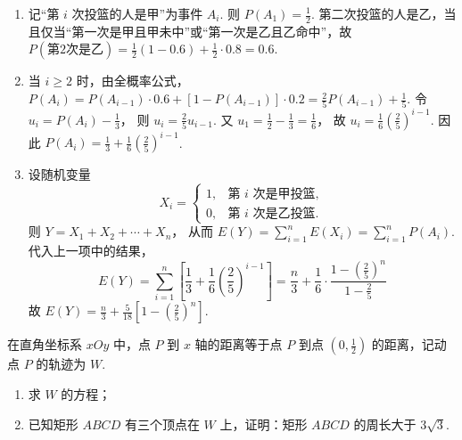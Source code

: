 \begin{solution}
\begin{enumerate}
\item 记“第 \(i\) 次投篮的人是甲”为事件 \(A_i\). 则
\(P(A_1)=\frac12\).
第二次投篮的人是乙，当且仅当“第一次是甲且甲未中”或“第一次是乙且乙命中”，故
\(P(\text{第2次是乙}) =\frac12(1-0.6)+\frac12\cdot 0.8 =0.6\).

\item 当 \(i\ge 2\) 时，由全概率公式，
\(P(A_i)=P(A_{i-1})\cdot 0.6+[1-P(A_{i-1})]\cdot 0.2 =\frac25P(A_{i-1})+\frac15\).
令
\(u_i=P(A_i)-\frac13\)，
则
\(u_i=\frac25u_{i-1}\).
又
\(u_1=\frac12-\frac13=\frac16\)，
故
\(u_i=\frac16\left(\frac25\right)^{i-1}\).
因此
\(P(A_i)=\frac13+\frac16\left(\frac25\right)^{i-1}\).

\item 设随机变量
\[
X_i=\begin{cases}
1,&\text{第 }i\text{ 次是甲投篮},\\
0,&\text{第 }i\text{ 次是乙投篮}.
\end{cases}
\]
则
\(Y=X_1+X_2+\cdots+X_n\)，
从而
\(E(Y)=\sum_{i=1}^n E(X_i)=\sum_{i=1}^n P(A_i)\).
代入上一项中的结果，
\[
E(Y)=\sum_{i=1}^n\left[\frac13+\frac16\left(\frac25\right)^{i-1}\right]=\frac{n}{3}+\frac16\cdot \frac{1-(\frac25)^n}{1-\frac25}
\]
故
\(E(Y)=\frac{n}{3}+\frac{5}{18}\left[1-\left(\frac25\right)^n\right]\).
\end{enumerate}
\end{solution}

\begin{problem}
在直角坐标系 \(xOy\) 中，点 \(P\) 到 \(x\) 轴的距离等于点 \(P\) 到点 \((0,\frac12)\) 的距离，记动点 \(P\) 的轨迹为 \(W\).
\begin{enumerate}
\item 求 \(W\) 的方程；
\item 已知矩形 \(ABCD\) 有三个顶点在 \(W\) 上，证明：矩形 \(ABCD\) 的周长大于 \(3\sqrt3\).
\end{enumerate}
\end{problem}

